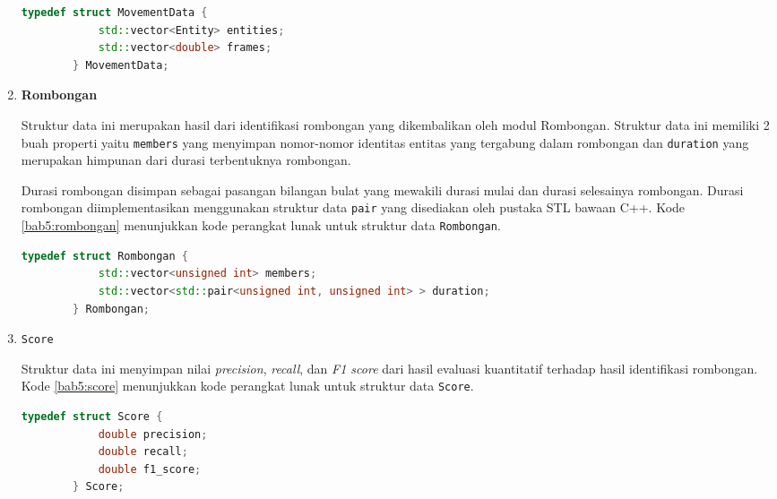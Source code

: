 \begin{enumerate}
    \begin{lstlisting}[language=C++, caption=Implementasi \texttt{MovementData}, label={bab5:movement-data}]
        typedef struct MovementData {
            std::vector<Entity> entities;
            std::vector<double> frames;
        } MovementData;
    \end{lstlisting}
    
    \item \textbf{Rombongan}
    
    Struktur data ini merupakan hasil dari identifikasi rombongan yang dikembalikan oleh modul Rombongan. Struktur data ini memiliki 2 buah properti yaitu \texttt{members} yang menyimpan nomor-nomor identitas entitas yang tergabung dalam rombongan dan \texttt{duration} yang merupakan himpunan dari durasi terbentuknya rombongan.
    
    Durasi rombongan disimpan sebagai pasangan bilangan bulat yang mewakili durasi mulai dan durasi selesainya rombongan. Durasi rombongan diimplementasikan menggunakan struktur data \texttt{pair} yang disediakan oleh pustaka STL bawaan C++. Kode \ref{bab5:rombongan} menunjukkan kode perangkat lunak untuk struktur data \texttt{Rombongan}.
    
    \begin{lstlisting}[language=C++, caption=Implementasi \texttt{Rombongan}, label={bab5:rombongan}]
        typedef struct Rombongan {
            std::vector<unsigned int> members;
            std::vector<std::pair<unsigned int, unsigned int> > duration;
        } Rombongan;
    \end{lstlisting}
    
    \item \texttt{Score}
    
    Struktur data ini menyimpan nilai \textit{precision}, \textit{recall}, dan \textit{F1 score} dari hasil evaluasi kuantitatif terhadap hasil identifikasi rombongan. Kode \ref{bab5:score} menunjukkan kode perangkat lunak untuk struktur data \texttt{Score}.
    
    \begin{lstlisting}[language=C++, caption=Implementasi \texttt{Score}, label={bab5:score}]
        typedef struct Score {
            double precision;
            double recall;
            double f1_score;
        } Score;
    \end{lstlisting}
\end{enumerate}